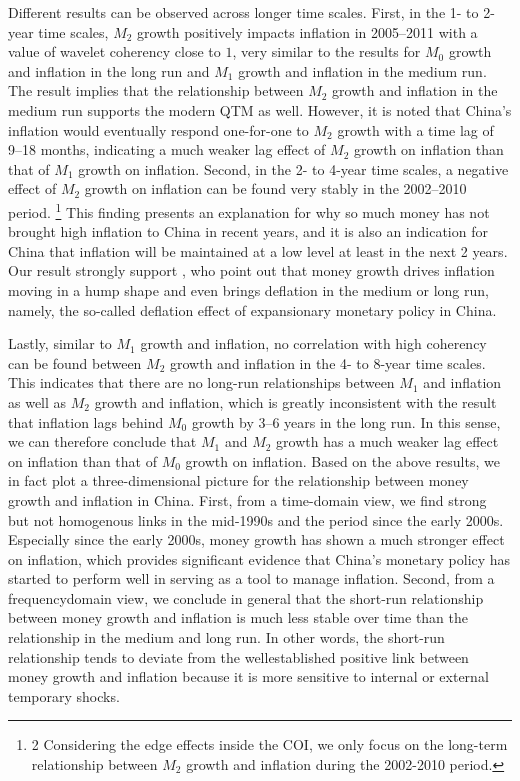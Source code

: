 \documentclass[a4paper,fleqn]{cas-sc}
\begin{document}
Different results can be observed across longer time scales. First, in the 1- to 2-year time scales, $M_2$ growth positively impacts inflation in 2005–2011 with a value of wavelet coherency close to $1$, very similar to the results for $M_0$ growth and inflation in the long run and $M_1$ growth and inflation in the medium run. The result implies that the relationship between $M_2$ growth and inflation in the medium run supports the modern QTM as well. However, it is noted that China's inflation would eventually respond one-for-one to $M_2$ growth with a time lag of 9–18 months, indicating a much weaker lag effect of $M_2$ growth on inflation than that of $M_1$ growth on inflation. Second, in the 2- to 4-year time scales, a negative effect of $M_2$ growth on inflation can be found very stably in the 2002–2010 period.
\footnote{2 Considering the edge effects inside the COI, we only focus on the long-term relationship between $M_2$ growth and inflation during the 2002-2010 period.}
This finding presents an explanation for why so much money has not brought high inflation to China in recent years, and it is also an indication for China that inflation will be maintained at a low level at least in the next 2 years. Our result strongly support \cite{Yanyan2009}, who point out that money growth drives inflation moving in a hump shape and even brings deflation in the medium or long run, namely, the so-called deflation effect of expansionary monetary policy in China.

Lastly, similar to $M_1$ growth and inflation, no correlation with high coherency can be found between $M_2$ growth and inflation in the 4- to 8-year time scales. This indicates that there are no long-run relationships between $M_1$ and inflation as well as $M_2$ growth and inflation, which is greatly inconsistent with the result that inflation lags behind $M_0$ growth by 3–6 years in the long run. In this sense, we can therefore conclude that $M_1$ and $M_2$ growth has a much weaker lag effect on inflation than that of $M_0$ growth on inflation. Based on the above results, we in fact plot a three-dimensional picture for the relationship between money growth and inflation in China. First, from a time-domain view, we find strong but not homogenous links in the mid-1990s and the period since the early 2000s. Especially since the early 2000s, money growth has shown a much stronger effect on inflation, which provides significant evidence that China's monetary policy has started to perform well in serving as a tool to manage inflation. Second, from a frequencydomain view, we conclude in general that the short-run relationship between money growth and inflation is much less stable over time than the relationship in the medium and long run. In other words, the short-run relationship tends to deviate from the wellestablished positive link between money growth and inflation because it is more sensitive to internal or external temporary shocks. 
\end{document}
